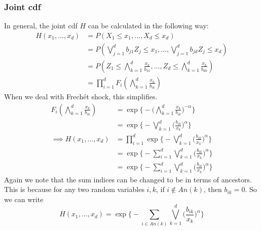 \documentclass[12pt]{article}
\theoremstyle{definition}
\theoremstyle{definition}
\begin{document}
\subsubsection{Joint cdf}
In general, the joint cdf $H$ can be calculated in the following way:
\begin{align*}
    H(x_1,\hdots, x_d)&=P(X_1\leq x_1,\hdots,X_d\leq x_d)\\
    &=P(\bigvee_{j=1}^db_{j1}Z_j\leq x_1, \hdots, \bigvee_{j=1}^db_{jd}Z_j\leq x_d)\\
    &=P(Z_1\leq{\bigwedge_{k=1}^d\frac{x_k}{b_{1k}}},\hdots, Z_d\leq\bigwedge_{k=1}^d\frac{x_k}{b_{dk}})\\
    &=\prod_{i=1}^dF_i(\bigwedge_{k=1}^d\frac{x_k}{b_{ik}})
\end{align*}
When we deal with Frechét shock, this simplifies.
\begin{align*}
    F_i(\bigwedge_{k=1}^d\frac{x_k}{b_{ik}})&=\exp\bigg\{-\bigg(\bigwedge_{k=1}^d\frac{x_k}{b_{ik}}\bigg)^{-\alpha}\bigg\}\\
    &=\exp\bigg\{-\bigvee_{k=1}^d \bigg( \frac{b_{ik}}{x_k} \bigg)^\alpha\bigg\}\\
    \implies H(x_1,\hdots, x_d)&=\prod_{i=1}^d\exp\bigg\{-\bigvee_{k=1}^d \bigg( \frac{b_{ik}}{x_k} \bigg)^\alpha\bigg\}\\
    &=\exp\bigg\{ -\sum_{i=1}^d \bigvee_{k=1}^d \bigg( \frac{b_{ik}}{x_k} \bigg)^\alpha \bigg\}\\
    &=\exp\bigg\{ -\sum_{i=1}^d \bigvee_{k=1}^d \bigg( \frac{b_{ik}}{x_k} \bigg)^\alpha \bigg\}
\end{align*}
Again we note that the sum indices can be changed to be in terms of ancestors. This is because for any two random variables $i,k$, if $i \notin An(k)$, then $b_{ik}=0$. So we can write 
$$H(x_1,\hdots,x_d)=\exp\bigg\{ -\sum_{i\in An(k)} \bigvee_{k=1}^d \bigg( \frac{b_{ik}}{x_k} \bigg)^\alpha \bigg\}$$
\end{document}
